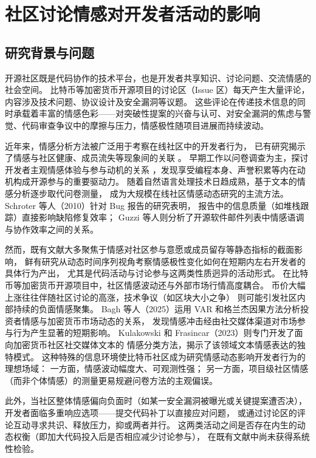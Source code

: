 \chapter{社区讨论情感对开发者活动的影响}

\section{研究背景与问题}

开源社区既是代码协作的技术平台，也是开发者共享知识、讨论问题、交流情感的社会空间。
比特币等加密货币开源项目的讨论区（Issue 区）每天产生大量评论，内容涉及技术问题、协议设计及安全漏洞等议题。
这些评论在传递技术信息的同时承载着丰富的情感色彩——对突破性提案的兴奋与认可、对安全漏洞的焦虑与警觉、代码审查争议中的摩擦与压力，情感极性随项目进展而持续波动。

近年来，情感分析方法被广泛用于考察在线社区中的开发者行为，
已有研究揭示了情感与社区健康、成员流失等现象间的关联
\cite{yang2021differential,fang2009understanding}。
早期工作以问卷调查为主，探讨开发者主观情感体验与参与动机的关系
\cite{shah2006motivation}，发现享受编程本身、声誉积累等内在动机构成开源参与的重要驱动力。
随着自然语言处理技术日趋成熟，基于文本的情感分析逐步取代问卷测量，
成为大规模在线社区情感动态研究的主流方法\cite{guzzi2013}。
Schroter 等人（2010）针对 Bug 报告的研究表明，
报告中的信息质量（如堆栈跟踪）直接影响缺陷修复效率\cite{schroter2010}；
Guzzi 等人则分析了开源软件邮件列表中情感语调与协作效率之间的关系\cite{guzzi2013}。

然而，既有文献大多聚焦于情感对社区参与意愿或成员留存等静态指标的截面影响，
鲜有研究从动态时间序列视角考察情感极性变化如何在短期内左右开发者的具体行为产出，
尤其是代码活动与讨论参与这两类性质迥异的活动形式。
在比特币等加密货币开源项目中，社区情感波动还与外部市场行情高度耦合。
币价大幅上涨往往伴随社区讨论的高涨，技术争议（如区块大小之争）
则可能引发社区内部持续的负面情感聚集\cite{kobayakawa2020impact}。
Bagh 等人（2025）运用 VAR 和格兰杰因果方法分析投资者情感与加密货币市场动态的关系，
发现情感冲击经由社交媒体渠道对市场参与行为产生显著的短期影响\cite{bagh2025investor}。
Kulakowski 和 Frasincar（2023）则专门开发了面向加密货币社区社交媒体文本的
情感分类方法，揭示了该领域文本情感表达的独特模式\cite{kulakowski2023sentiment}。
这种特殊的信息环境使比特币社区成为研究情感动态影响开发者行为的理想场域：
一方面，情感波动幅度大、可观测性强；
另一方面，项目级社区情感（而非个体情感）的测量更易规避问卷方法的主观偏误。

此外，当社区整体情感偏向负面时（如某一安全漏洞被曝光或关键提案遭否决），
开发者面临多重响应选项——提交代码补丁以直接应对问题，
或通过讨论区的评论互动寻求共识、释放压力，抑或两者并行。
这两类活动之间是否存在内生的动态权衡（即加大代码投入后是否相应减少讨论参与），
在既有文献中尚未获得系统性检验。

